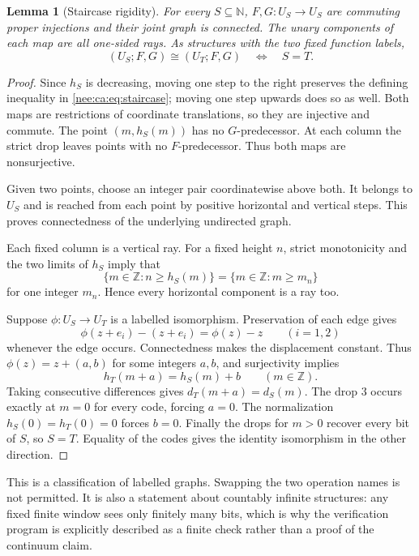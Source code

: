 \documentclass[11pt,letterpaper]{article}
\numberwithin{equation}{section}
\theoremstyle{plain}
\newtheorem{lemma}[lemma]{Lemma}
\theoremstyle{definition}
\theoremstyle{remark}
\newcommand{\NN}{\mathbb N}
\newcommand{\ZZ}{\mathbb Z}
\begin{document}
\begin{lemma}[Staircase rigidity]\label{nee:ca:lem:staircase}
For every $S\subseteq\NN$, $F,G:U_S\to U_S$ are commuting proper injections and their joint graph is connected. The unary components of each map are all one-sided rays. As structures with the two fixed function labels,
\[
(U_S;F,G)\cong(U_T;F,G)\quad\Longleftrightarrow\quad S=T.
\]
\end{lemma}
\begin{proof}
Since $h_S$ is decreasing, moving one step to the right preserves the defining inequality in \eqref{nee:ca:eq:staircase}; moving one step upwards does so as well. Both maps are restrictions of coordinate translations, so they are injective and commute. The point $(m,h_S(m))$ has no $G$-predecessor. At each column the strict drop leaves points with no $F$-predecessor. Thus both maps are nonsurjective.

Given two points, choose an integer pair coordinatewise above both. It belongs to $U_S$ and is reached from each point by positive horizontal and vertical steps. This proves connectedness of the underlying undirected graph.

Each fixed column is a vertical ray. For a fixed height $n$, strict monotonicity and the two limits of $h_S$ imply that
\[
\{m\in\ZZ:n\geq h_S(m)\}=\{m\in\ZZ:m\geq m_n\}
\]
for one integer $m_n$. Hence every horizontal component is a ray too.

Suppose $\phi:U_S\to U_T$ is a labelled isomorphism. Preservation of each edge gives
\[
\phi(z+e_i)-(z+e_i)=\phi(z)-z\qquad(i=1,2)
\]
whenever the edge occurs. Connectedness makes the displacement constant. Thus $\phi(z)=z+(a,b)$ for some integers $a,b$, and surjectivity implies
\[
h_T(m+a)=h_S(m)+b\qquad(m\in\ZZ).
\]
Taking consecutive differences gives $d_T(m+a)=d_S(m)$. The drop $3$ occurs exactly at $m=0$ for every code, forcing $a=0$. The normalization $h_S(0)=h_T(0)=0$ forces $b=0$. Finally the drops for $m>0$ recover every bit of $S$, so $S=T$. Equality of the codes gives the identity isomorphism in the other direction.
\end{proof}

This is a classification of labelled graphs. Swapping the two operation names is not permitted. It is also a statement about countably infinite structures: any fixed finite window sees only finitely many bits, which is why the verification program is explicitly described as a finite check rather than a proof of the continuum claim.
\end{document}
